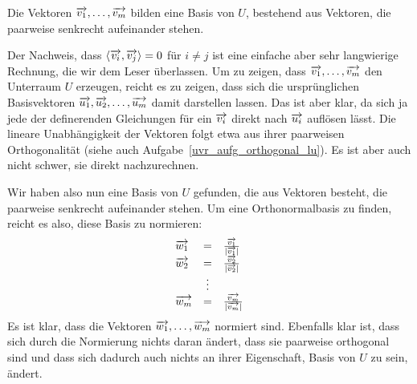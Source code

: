 {Die Vektoren $\overrightarrow{v_1}, \ldots , \overrightarrow{v_m}$ bilden eine Basis von $U$, bestehend aus Vektoren, 
die paarweise senkrecht aufeinander stehen. 

Der Nachweis, dass $\langle \overrightarrow{v_i}, \overrightarrow{v_j} \rangle = 0$ für $i \neq j$ ist eine 
einfache aber sehr langwierige Rechnung, die wir dem Leser überlassen. Um zu zeigen, dass $\overrightarrow{v_1}, 
\ldots , \overrightarrow{v_m}$ den Unterraum $U$ erzeugen, reicht es zu zeigen, dass sich die ursprünglichen 
Basisvektoren $\overrightarrow{u_1}, \overrightarrow{u_2}, \ldots, \overrightarrow{u_m}$ damit darstellen 
lassen. Das ist aber klar, da sich ja jede der definerenden Gleichungen für ein $\overrightarrow{v_i}$ direkt
nach $\overrightarrow{u_i}$ auflösen lässt. Die lineare Unabhängigkeit der Vektoren folgt etwa aus 
ihrer paarweisen Orthogonalität (siehe auch Aufgabe~\ref{uvr_aufg_orthogonal_lu}). Es ist aber auch 
nicht schwer, sie direkt nachzurechnen. 

Wir haben also nun eine Basis von $U$ gefunden, die aus Vektoren besteht, die paarweise senkrecht 
aufeinander stehen. Um eine Orthonormalbasis zu finden, reicht es also, diese Basis zu normieren:
  	$$ \begin{array}{l c l}
  	\overrightarrow{w_1} & = & \frac {\overrightarrow{v_1}}{\vert \overrightarrow{v_1} \vert} \\
  	\overrightarrow{w_2} & = & \frac {\overrightarrow{v_2}}{\vert \overrightarrow{v_2} \vert} \\
   	& \vdots & \\
  	\overrightarrow{w_m} & = & \frac {\overrightarrow{v_m}}{\vert \overrightarrow{v_m} \vert}
  	\end{array} $$
Es ist klar, dass die Vektoren $\overrightarrow{w_1}, \ldots , \overrightarrow{w_m}$ normiert sind. Ebenfalls 
klar ist, dass sich durch die Normierung nichts daran ändert, dass sie paarweise orthogonal sind und dass 
sich dadurch auch nichts an ihrer Eigenschaft, Basis von $U$ zu sein, ändert.
}

\medbreak

